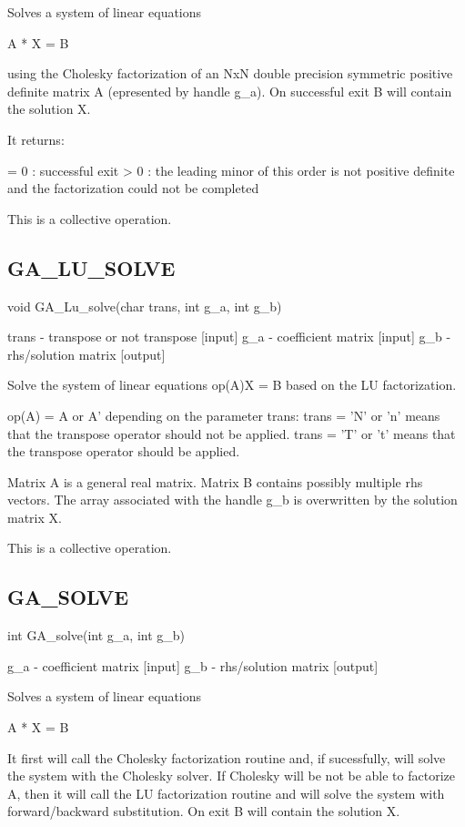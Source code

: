 Solves a system of linear equations

A {*} X = B

using the Cholesky factorization of an NxN double precision symmetric
positive definite matrix A (epresented by handle g\_a). On successful
exit B will contain the solution X.

It returns:

= 0 : successful exit > 0 : the leading minor of this order is not
positive definite and the factorization could not be completed

This is a collective operation. 


\subsection*{GA\_LU\_SOLVE}

void GA\_Lu\_solve(char trans, int g\_a, int g\_b)

trans - transpose or not transpose {[}input{]} g\_a - coefficient
matrix {[}input{]} g\_b - rhs/solution matrix {[}output{]}

Solve the system of linear equations op(A)X = B based on the LU factorization.

op(A) = A or A' depending on the parameter trans: trans = 'N' or 'n'
means that the transpose operator should not be applied. trans = 'T'
or 't' means that the transpose operator should be applied.

Matrix A is a general real matrix. Matrix B contains possibly multiple
rhs vectors. The array associated with the handle g\_b is overwritten
by the solution matrix X.

This is a collective operation.


\subsection*{GA\_SOLVE}

int GA\_solve(int g\_a, int g\_b)

g\_a - coefficient matrix {[}input{]} g\_b - rhs/solution matrix {[}output{]}

Solves a system of linear equations

A {*} X = B

It first will call the Cholesky factorization routine and, if sucessfully,
will solve the system with the Cholesky solver. If Cholesky will be
not be able to factorize A, then it will call the LU factorization
routine and will solve the system with forward/backward substitution.
On exit B will contain the solution X.

